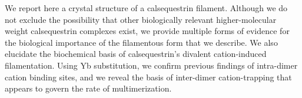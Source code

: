 We report here a crystal structure of a calsequestrin filament. Although we do not exclude the possibility that other biologically relevant higher-molecular weight calsequestrin complexes exist, we provide multiple forms of evidence for the biological importance of the filamentous form that we describe. We also elucidate the biochemical basis of calsequestrin's divalent cation-induced filamentation. Using Yb substitution, we confirm previous findings of intra-dimer cation binding sites, and we reveal the basis of inter-dimer cation-trapping that appears to govern the rate of multimerization. 
